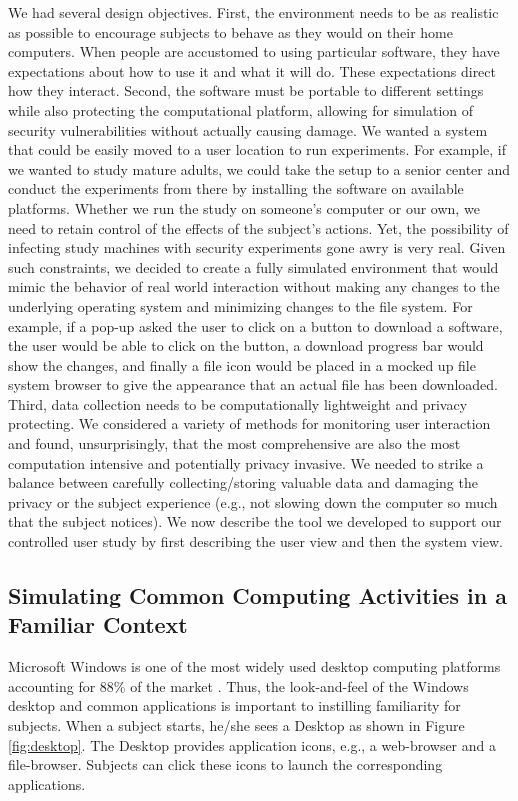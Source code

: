 We had several design objectives. First, the environment needs to be as realistic as possible to encourage subjects to behave as they would on their home computers. When people are accustomed to using particular software, they have expectations about how to use it and what it will do. These expectations direct how they interact. Second, the software must be portable to different settings while also protecting the computational platform, allowing for simulation of security vulnerabilities without actually causing damage. We wanted a system that could be easily moved to a user location to run experiments. For example, if we wanted to study mature adults, we could take the setup to a senior center and conduct the experiments from there by installing the software on available platforms. Whether we run the study on someone's computer or our own, we need to retain control of the effects of the subject's actions. Yet, the possibility of infecting study machines with security experiments gone awry is very real. Given such constraints, we decided to create a fully simulated environment that would mimic the behavior of real world interaction without making any changes to the underlying operating system and minimizing changes to the file system. For example, if a pop-up asked the user to click on a button to download a software, the user would be able to click on the button, a download progress bar would show the changes, and finally a file icon would be placed in a mocked up file system browser to give the appearance that an actual file has been downloaded. Third, data collection needs to be computationally lightweight and privacy protecting. We considered a variety of methods for monitoring user interaction and found, unsurprisingly, that the most comprehensive are also the most computation intensive and potentially privacy invasive. We needed to strike a balance between carefully collecting/storing valuable data and damaging the privacy or the subject experience (e.g., not slowing down the computer so much that the subject notices). We now describe the tool we developed to support our controlled user study by first describing the user view and then the system view.

\subsection{Simulating Common Computing Activities in a Familiar Context}
Microsoft Windows is one of the most widely used desktop computing platforms accounting for 88\% of the market \cite{zdnet2020}. Thus, the look-and-feel of the Windows desktop and common applications is important to instilling familiarity for subjects. When a subject starts, he/she sees a Desktop as shown in Figure \ref{fig:desktop}. The Desktop provides application icons, e.g., a web-browser and a file-browser. Subjects can click these icons to launch the corresponding applications.

